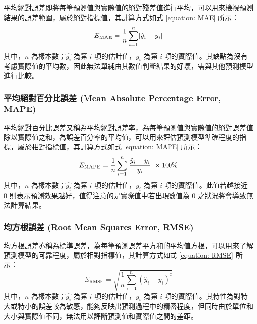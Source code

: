 平均絕對誤差即將每筆預測值與實際值的絕對殘差值進行平均，可以用來檢視預測結果的誤差範圍，屬於絕對指標值，其計算方式如式 \eqref{equation: MAE} 所示：
%
\begin{equation} \label{equation: MAE}
  E_{\text{MAE}} = \frac{1}{n} \sum_{i = 1}^{n} \abs{\hat{y}_{i} - y_i}
\end{equation}
%
其中，$n$ 為樣本數；$\hat{y_i}$ 為第 $i$ 項的估計值，$y_i$ 為第 $i$ 項的實際值。其缺點為沒有考慮實際值的平均數，因此無法單純由其數值判斷結果的好壞，需與其他預測模型進行比較。

\subsubsection{平均絕對百分比誤差 (Mean Absolute Percentage Error, MAPE)}

平均絕對百分比誤差又稱為平均絕對誤差率，為每筆預測值與實際值的絕對誤差值除以實際值之和，為誤差百分率的平均值，可以用來評估預測模型準確程度的指標，屬於相對指標值，其計算方式如式 \eqref{equation: MAPE} 所示：
%
\begin{equation} \label{equation: MAPE}
  E_{\text{MAPE}} = \frac{1}{n} \sum_{i = 1}^{n} \abs{\frac{\hat{y}_{i} - y_i}{y_i}} \times 100\%
\end{equation}
%
其中，$n$ 為樣本數；$\hat{y_i}$ 為第 $i$ 項的估計值，$y_i$ 為第 $i$ 項的實際值。此值若越接近 $0$ 則表示預測效果越好，值得注意的是實際值中若出現數值為 $0$ 之狀況將會導致無法計算結果。

\subsubsection{均方根誤差 (Root Mean Squares Error, RMSE)}

均方根誤差亦稱為標準誤差，為每筆預測誤差平方和的平均值方根，可以用來了解預測模型的可靠程度，屬於相對指標值，其計算方式如式 \eqref{equation: RMSE} 所示：
%
\begin{equation} \label{equation: RMSE}
  E_{\text{RMSE}} = \sqrt{\frac{1}{n} \sum_{i = 1}^{n} (\hat{y}_{i} - y_i)^2}
\end{equation}
%
其中，$n$ 為樣本數；$\hat{y_i}$ 為第 $i$ 項的估計值，$y_i$ 為第 $i$ 項的實際值。其特性為對特大或特小的誤差較為敏感，能夠反映出預測過程中的精密程度，但同時由於單位和大小與實際值不同，無法用以評斷預測值和實際值之間的差距。

